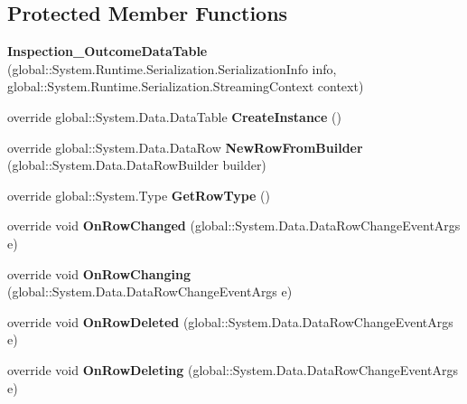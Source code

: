 \subsection*{Protected Member Functions}
\begin{DoxyCompactItemize}
\item 
\mbox{\label{class_a_f_h___scheduler_1_1_home_inspection_data_set_1_1_inspection___outcome_data_table_ac2b89397aac5c115f60228c7de957ae4}} 
{\bfseries Inspection\+\_\+\+Outcome\+Data\+Table} (global\+::\+System.\+Runtime.\+Serialization.\+Serialization\+Info info, global\+::\+System.\+Runtime.\+Serialization.\+Streaming\+Context context)
\item 
\mbox{\label{class_a_f_h___scheduler_1_1_home_inspection_data_set_1_1_inspection___outcome_data_table_aaa8ea8612db4445d956ae7caf73cd0b3}} 
override global\+::\+System.\+Data.\+Data\+Table {\bfseries Create\+Instance} ()
\item 
\mbox{\label{class_a_f_h___scheduler_1_1_home_inspection_data_set_1_1_inspection___outcome_data_table_a261902ebfa65c94b30125633a3177433}} 
override global\+::\+System.\+Data.\+Data\+Row {\bfseries New\+Row\+From\+Builder} (global\+::\+System.\+Data.\+Data\+Row\+Builder builder)
\item 
\mbox{\label{class_a_f_h___scheduler_1_1_home_inspection_data_set_1_1_inspection___outcome_data_table_a4f296f1a56b701171d9ebdb2f1ff96e2}} 
override global\+::\+System.\+Type {\bfseries Get\+Row\+Type} ()
\item 
\mbox{\label{class_a_f_h___scheduler_1_1_home_inspection_data_set_1_1_inspection___outcome_data_table_a1b1f6b79bb552492539e4170a8d86b23}} 
override void {\bfseries On\+Row\+Changed} (global\+::\+System.\+Data.\+Data\+Row\+Change\+Event\+Args e)
\item 
\mbox{\label{class_a_f_h___scheduler_1_1_home_inspection_data_set_1_1_inspection___outcome_data_table_a8b88af67f214d3069d1e11d558ed0819}} 
override void {\bfseries On\+Row\+Changing} (global\+::\+System.\+Data.\+Data\+Row\+Change\+Event\+Args e)
\item 
\mbox{\label{class_a_f_h___scheduler_1_1_home_inspection_data_set_1_1_inspection___outcome_data_table_ac392fd0ebbe451d365b8e8328799fba2}} 
override void {\bfseries On\+Row\+Deleted} (global\+::\+System.\+Data.\+Data\+Row\+Change\+Event\+Args e)
\item 
\mbox{\label{class_a_f_h___scheduler_1_1_home_inspection_data_set_1_1_inspection___outcome_data_table_a8ee741222b456ecfd588b12882ec58a3}} 
override void {\bfseries On\+Row\+Deleting} (global\+::\+System.\+Data.\+Data\+Row\+Change\+Event\+Args e)
\end{DoxyCompactItemize}
